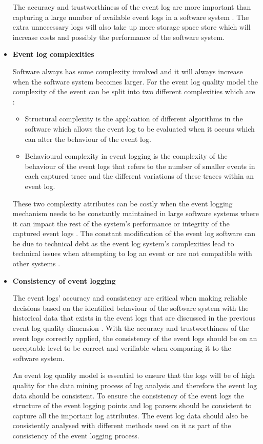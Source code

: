 \begin{itemize}
	The accuracy and trustworthiness of the event log are more important than capturing a large number of available event logs in a software system \cite{Zhu2015, Jans2012}. The extra unnecessary logs will also take up more storage space store which will increase costs and possibly the performance of the software system. 

	\item \textbf{Event log complexities}\par Software always has some complexity involved and it will always increase when the software system becomes larger. For the event log quality model the complexity of the event can be split into two different complexities which are \cite{Kherbouche2017}:

	\begin{itemize}
		\item Structural complexity is the application of different algorithms in the software which allows the event log to be evaluated when it occurs which can alter the behaviour of the event log.
		\item Behavioural complexity in event logging is the complexity of the behaviour of the event logs that refers to the number of smaller events in each captured trace and the different variations of these traces within an event log.
	\end{itemize}

	These two complexity attributes can be costly when the event logging mechanism needs to be constantly maintained in large software systems where it can impact the rest of the system's performance or integrity of the captured event logs \cite{Ogheneovo2014}. The constant modification of the event log software can be due to technical debt as the event log system's complexities lead to technical issues when attempting to log an event or are not compatible with other systems \cite{DeLeon-Sigg2020}.  

 	\item \textbf{Consistency of event logging}\par The event logs' accuracy and consistency are critical when making reliable decisions based on the identified behaviour of the software system with the historical data that exists in the event logs that are discussed in the previous event log quality dimension \cite{Stojanov2017, Kherbouche2017}. With the accuracy and trustworthiness of the event logs correctly applied, the consistency of the event logs should be on an acceptable level to be correct and verifiable when comparing it to the software system. \par An event log quality model is essential to ensure that the logs will be of high quality for the data mining process of log analysis and therefore the event log data should be consistent. To ensure the consistency of the event logs the structure of the event logging points and log parsers should be consistent to capture all the important log attributes. The event log data should also be consistently analysed with different methods used on it as part of the consistency of the event logging process.


\end{itemize}
